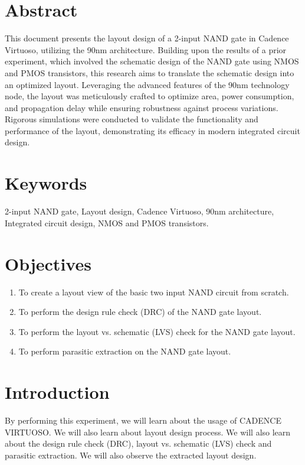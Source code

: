 \documentclass[11pt]{article}
\begin{document}
\tableofcontents
\listoffigures
\pagestyle{fancy}
\fancyhead{}
\fancyfoot{}
\newpage
\setcounter{page}{1}
\section{Abstract}
This document presents the layout design of a 2-input NAND gate in Cadence Virtuoso, utilizing the 90nm architecture. Building upon the results of a prior experiment, which involved the schematic design of the NAND gate using NMOS and PMOS transistors, this research aims to translate the schematic design into an optimized layout. Leveraging the advanced features of the 90nm technology node, the layout was meticulously crafted to optimize area, power consumption, and propagation delay while ensuring robustness against process variations. Rigorous simulations were conducted to validate the functionality and performance of the layout, demonstrating its efficacy in modern integrated circuit design.
\section{Keywords}
2-input NAND gate, Layout design, Cadence Virtuoso, 90nm architecture, Integrated circuit design, NMOS and PMOS transistors.
\section{Objectives}
\begin{enumerate}
    \item To create a layout view of the basic two input NAND circuit from scratch.
    \item To perform the design rule check (DRC) of the NAND gate layout.
    \item To perform the layout vs. schematic (LVS) check for the NAND gate layout.
    \item To perform parasitic extraction on the NAND gate layout.
\end{enumerate}
\section{Introduction}
By performing this experiment, we will learn about the usage of
CADENCE VIRTUOSO. We will also learn about layout design process. We will also learn about the design rule check (DRC), layout vs. schematic (LVS) check and parasitic extraction. We will also observe the extracted layout design.
\end{document}
